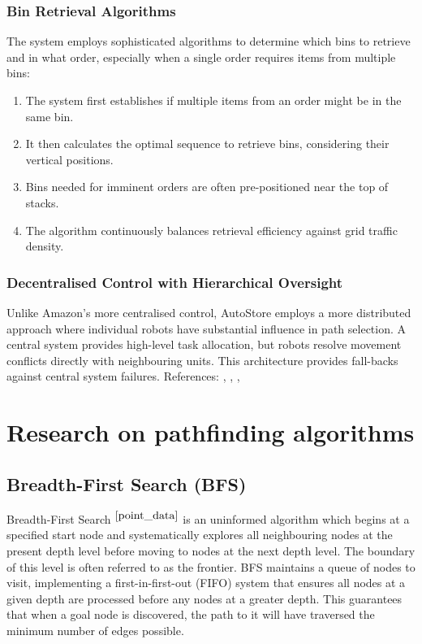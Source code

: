 \subsubsection{Bin Retrieval Algorithms}
The system employs sophisticated algorithms to determine which bins to retrieve and in what order, especially when a single order requires items from multiple bins:
\begin{enumerate}
    \item The system first establishes if multiple items from an order might be in the same bin.
    \item It then calculates the optimal sequence to retrieve bins, considering their vertical positions.
    \item Bins needed for imminent orders are often pre-positioned near the top of stacks.
    \item The algorithm continuously balances retrieval efficiency against grid traffic density.
\end{enumerate}

\subsubsection{Decentralised Control with Hierarchical Oversight}
Unlike Amazon's more centralised control, AutoStore employs a more distributed approach where individual robots have substantial influence in path selection. A central system provides high-level task allocation, but robots resolve movement conflicts directly with neighbouring units. This architecture provides fall-backs against central system failures. \newline References: \cite{autostore_2023_autostore}, \cite{solutions_2025_autostore}, \cite{systems_2018_autostore}, \cite{systems_autostore}

\newpage

\section{Research on pathfinding algorithms}

\subsection{Breadth-First Search (BFS)}
Breadth-First Search $^{\cite{point_data}}$ is an uninformed algorithm which begins at a specified start node and systematically explores all neighbouring nodes at the present depth level before moving to nodes at the next depth level. The boundary of this level is often referred to as the frontier. BFS maintains a queue of nodes to visit, implementing a first-in-first-out (FIFO) system that ensures all nodes at a given depth are processed before any nodes at a greater depth. This guarantees that when a goal node is discovered, the path to it will have traversed the minimum number of edges possible.
